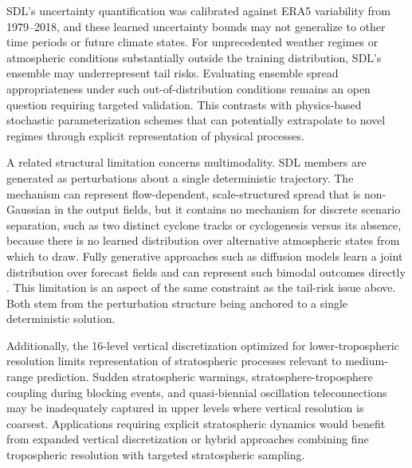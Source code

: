 \documentclass{agujournal2019}
\begin{document}
SDL's uncertainty quantification was calibrated against ERA5 variability from 1979–2018, and these learned uncertainty bounds may not generalize to other time periods or future climate states. For unprecedented weather regimes or atmospheric conditions substantially outside the training distribution, SDL's ensemble may underrepresent tail risks. Evaluating ensemble spread appropriateness under such out-of-distribution conditions remains an open question requiring targeted validation. This contrasts with physics-based stochastic parameterization schemes that can potentially extrapolate to novel regimes through explicit representation of physical processes.

A related structural limitation concerns multimodality. SDL members are generated as perturbations about a single deterministic trajectory. The mechanism can represent flow-dependent, scale-structured spread that is non-Gaussian in the output fields, but it contains no mechanism for discrete scenario separation, such as two distinct cyclone tracks or cyclogenesis versus its absence, because there is no learned distribution over alternative atmospheric states from which to draw. Fully generative approaches such as diffusion models learn a joint distribution over forecast fields and can represent such bimodal outcomes directly \cite{price2025gencast}. This limitation is an aspect of the same constraint as the tail-risk issue above. Both stem from the perturbation structure being anchored to a single deterministic solution.

Additionally, the 16-level vertical discretization optimized for lower-tropospheric resolution limits representation of stratospheric processes relevant to medium-range prediction. Sudden stratospheric warmings, stratosphere-troposphere coupling during blocking events, and quasi-biennial oscillation teleconnections may be inadequately captured in upper levels where vertical resolution is coarsest. Applications requiring explicit stratospheric dynamics would benefit from expanded vertical discretization or hybrid approaches combining fine tropospheric resolution with targeted stratospheric sampling.


\end{document}

